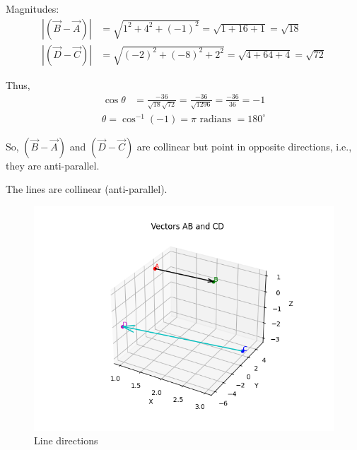 \documentclass[12pt]{article}
\begin{document}
Magnitudes:
\begin{align}
|(\vec{B}-\vec{A})| &= \sqrt{1^2 + 4^2 + (-1)^2} = \sqrt{1 + 16 + 1} = \sqrt{18} \\
|(\vec{D}-\vec{C})| &= \sqrt{(-2)^2 + (-8)^2 + 2^2} = \sqrt{4 + 64 + 4} = \sqrt{72}
\end{align}

Thus,
\begin{align}
\cos\theta &= \frac{-36}{\sqrt{18}\sqrt{72}}
= \frac{-36}{\sqrt{1296}}
= \frac{-36}{36}
= -1
\end{align}
\begin{align}
\theta = \cos^{-1}(-1) = \pi \text{ radians } = 180^\circ
\end{align}

So, $(\vec{B}-\vec{A})$ and $(\vec{D}-\vec{C})$ are collinear but point in opposite directions, i.e., they are anti-parallel.

\vspace{0.5cm}
\centering
The lines are collinear (anti-parallel).

\begin{figure}[H]
    \centering
    \includegraphics[width=0.7\columnwidth]{Figs/Figure.png}
    \caption{Line directions}
    \label{fig:ab_cd}
\end{figure}
\end{document}
